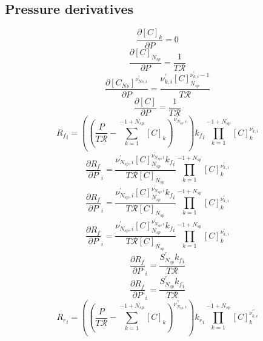 \documentclass[a4paper,10pt]{article}
\newcommand{\ns}{N_{sp}}
\newcommand{\Ru}{\mathcal{R}}
\begin{document}
\subsection{Pressure derivatives}
\begin{dmath} \frac{\partial [C]_{k} }{\partial P } = 0\end{dmath} 
\begin{dmath} \frac{\partial [C]_{\ns} }{\partial P } = \frac{1}{T \Ru}\end{dmath} 
\begin{dmath} \frac{\partial [C_{Ns}]^{\nu^{\prime}_{Ns, i}}}{\partial P } = \frac{\nu^{\prime}_{k,i} [C]_{\ns}^{\nu^{\prime}_{k,i} - 1}}{T \Ru}\end{dmath} 
\begin{dmath} \frac{\partial [C] }{\partial P } = \frac{1}{T \Ru}\end{dmath} 
\begin{dmath} {R_f}_{i} = \left(\left(\frac{P}{T \Ru} - \sum_{k=1}^{-1 + \ns} [C]_{k}\right)^{\nu^{\prime}_{\ns,i}}\right) {k_f}_{i} \prod_{k=1}^{-1 + \ns} [C]_{k}^{\nu^{\prime}_{k,i}}\end{dmath} 
\begin{dmath} \frac{\partial {R_f} }{\partial P }_{i} = \frac{\nu^{\prime}_{\ns,i} [C]_{\ns}^{\nu^{\prime}_{\ns,i}} {k_f}_{i}}{T \Ru [C]_{\ns}} \prod_{k=1}^{-1 + \ns} [C]_{k}^{\nu^{\prime}_{k,i}}\end{dmath} 
\begin{dmath} \frac{\partial {R_f} }{\partial P }_{i} = \frac{\nu^{\prime}_{\ns,i} [C]_{\ns}^{\nu^{\prime}_{\ns,i}} {k_f}_{i}}{T \Ru [C]_{\ns}} \prod_{k=1}^{-1 + \ns} [C]_{k}^{\nu^{\prime}_{k,i}}\end{dmath} 
\begin{dmath} \frac{\partial {R_f} }{\partial P }_{i} = \frac{\nu^{\prime}_{\ns,i} [C]_{\ns}^{\nu^{\prime}_{\ns,i}} {k_f}_{i}}{T \Ru [C]_{\ns}} \prod_{k=1}^{-1 + \ns} [C]_{k}^{\nu^{\prime}_{k,i}}\end{dmath} 
\begin{dmath} \frac{\partial {R_f} }{\partial P }_{i} = \frac{S^{\prime}_{\ns} {k_f}_{i}}{T \Ru}\end{dmath} 
\begin{dmath} \frac{\partial {R_f} }{\partial P }_{i} = \frac{S^{\prime}_{\ns} {k_f}_{i}}{T \Ru}\end{dmath} 
\begin{dmath} {R_r}_{i} = \left(\left(\frac{P}{T \Ru} - \sum_{k=1}^{-1 + \ns} [C]_{k}\right)^{\nu^{\prime\prime}_{\ns,i}}\right) {k_r}_{i} \prod_{k=1}^{-1 + \ns} [C]_{k}^{\nu^{\prime\prime}_{k,i}}\end{dmath} 
\end{document}
